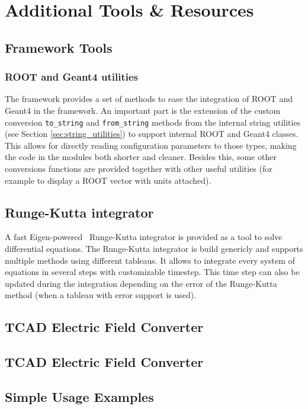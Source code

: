 \section{Additional Tools \& Resources}
\label{sec:additional_tools_resources}

\subsection{Framework Tools}
\subsubsection{ROOT and Geant4 utilities}
\label{sec:root_and_geant4_utilities}
The framework provides a set of methods to ease the integration of ROOT and Geant4 in the framework. An important part is the extension of the custom conversion \texttt{to\_string} and \texttt{from\_string} methods from the internal string utilities (see Section \ref{sec:string_utilities}) to support internal ROOT and Geant4 classes. This allows for directly reading configuration parameters to those types, making the code in the modules both shorter and cleaner. Besides this, some other conversions functions are provided together with other useful utilities (for example to display a ROOT vector with units attached).

\subsection{Runge-Kutta integrator}
A fast Eigen-powered~\cite{eigen3} Runge-Kutta integrator is provided as a tool to solve differential equations. The Runge-Kutta integrator is build genericly and supports multiple methods using different tableaus. It allows to integrate every system of equations in several steps with customizable timestep. This time step can also be updated during the integration depending on the error of the Runge-Kutta method (when a tableau with error support is used).

\subsection{TCAD Electric Field Converter}
\label{sec:tcad_electric_field_converter}
\wip
{}

\subsection{TCAD Electric Field Converter}
\label{sec:tcad_electric_field_converter}
\wip
{}

\subsection{Simple Usage Examples}
\wip
{}
